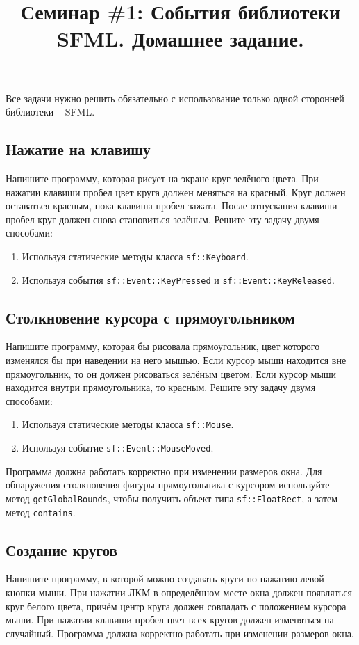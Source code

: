 \documentclass{article}
\begin{document}
\title{Семинар \#1: События библиотеки SFML. Домашнее задание.\vspace{-5ex}}\date{}\maketitle
Все задачи нужно решить обязательно с использование только одной сторонней библиотеки -- SFML.


\subsection{Нажатие на клавишу}
Напишите программу, которая рисует на экране круг зелёного цвета. При нажатии клавиши пробел цвет круга должен меняться на красный. Круг должен оставаться красным, пока клавиша пробел зажата. После отпускания клавиши пробел круг должен снова становиться зелёным. Решите эту задачу двумя способами:
\begin{enumerate}
\item Используя статические методы класса \texttt{sf::Keyboard}.
\item Используя события \texttt{sf::Event::KeyPressed} и \texttt{sf::Event::KeyReleased}.
\end{enumerate}

\subsection{Столкновение курсора с прямоугольником}
Напишите программу, которая бы рисовала прямоугольник, цвет которого изменялся бы при наведении на него мышью. Если курсор мыши находится вне прямоугольник, то он должен рисоваться зелёным цветом. Если курсор мыши находится внутри прямоугольника, то красным.
Решите эту задачу двумя способами:
\begin{enumerate}
\item Используя статические методы класса \texttt{sf::Mouse}.
\item Используя событие \texttt{sf::Event::MouseMoved}.
\end{enumerate}
Программа должна работать корректно при изменении размеров окна.
Для обнаружения столкновения фигуры прямоугольника с курсором используйте метод \texttt{getGlobalBounds}, чтобы получить объект типа \texttt{sf::FloatRect}, а затем метод \texttt{contains}.

\subsection{Создание кругов}
Напишите программу, в которой можно создавать круги по нажатию левой кнопки мыши. При нажатии ЛКМ в определённом месте окна должен появляться круг белого цвета, причём центр круга должен совпадать с положением курсора мыши. При нажатии клавиши пробел цвет всех кругов должен изменяться на случайный. Программа должна корректно работать при изменении размеров окна.
\end{document}
